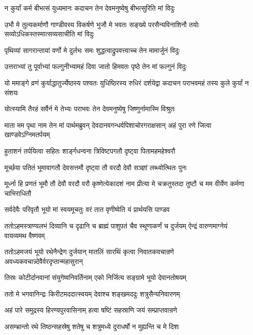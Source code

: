 \twolineshloka
{न कुर्यां कर्म बीभत्सं युध्यमानः कदाचन}
{तेन देवमनुष्येषु बीभत्सुरिति मां विदुः}


\threelineshloka
{उभौ मे तुल्यकर्माणौ गाण्डीवस्य विकर्षणे}
{भुजौ मे भवतः सङ्ख्ये परसैन्यविनाशिनौ}
{तयोः सव्योऽधिकस्तस्मात्सव्यसाचीति मां विदुः}


\twolineshloka
{पृथिव्यां सागरान्तायां वर्णो मे दुर्लभः समः}
{शुद्धत्वाद्रुपवत्त्वाच्च तेन मामार्जुनं विदुः}


\twolineshloka
{उत्तराभ्यां तु पूर्वाभ्यां फल्गुनीभ्यामहं दिवा}
{जातो हिमवतः पृष्ठे तेन मां फल्गुनं विदुः}


\threelineshloka
{यो ममाङ्गे व्रणं कुर्याद्धातुर्ज्येष्ठस्य पश्यतः}
{युधिष्ठिरस्य रुधिरं दर्शयेद्वा कदाचन}
{पराभवमहं तस्य कुले कुर्यां न संशयः}


\twolineshloka
{योत्स्यामि तैरहं सर्वैर्न मे तेभ्यः पराभवः}
{तेन देवमनुष्येषु जिष्णुर्नामास्मि विश्रुतः}


\onelineshloka
{माता मम पृथा नाम तेन मां पार्थमब्रुवन्}
\twolineshloka
{देवदानवगन्धर्वपिशाचोरगराक्षसान्}
{अहं पुरा रणे जित्वा खाण्डवेऽग्निमतर्पयम्}


\twolineshloka
{हुताशनं तर्पयित्वा सहितः शार्ङ्गधन्वना}
{त्रिविष्टपगतौ दृष्ट्वा पितामहमहेश्वरौ}


\twolineshloka
{मूर्च्छया पतितं भूमावागतौ देवसत्तमौ}
{दृष्ट्वा तौ वरदौ देवौ सञ्ज्ञां लब्ध्वोत्थितः पुनः}


\threelineshloka
{मूर्ध्ना हि प्रणतं भूमौ तौ देवौ वरदौ वरौ}
{कृष्णेत्येकादशं नाम प्रीत्या मे चक्रतुस्तदा}
{तुष्टौ च मम वीर्येण कर्मणा चाभिराधितौ}


\twolineshloka
{सर्वदेवैः परिवृतौ भूयो मां स्वयमूचतुः}
{वरं तात वृणीष्वेति यं प्रार्थयसि पाण्डव}


\threelineshloka
{ततोऽहमस्त्राण्यलभं दिव्यानि च दृढानि च}
{ब्राह्मं पाशुपतं चैव स्थूणाकर्णं च दुर्जयम्}
{ऐन्द्रं वारुणमाग्नेयं वायव्यमथ वैष्णवम्}


\threelineshloka
{ततोऽहमजयं भूयो रथेनैन्द्रेण दुर्जयान्}
{मातलिं सारथिं कृत्वा निवातकवचान्रणे}
{अवध्यकवचान्न्देवैर्वरदृप्तान्महासुरान्}


\twolineshloka
{तिस्रः कोटीर्दानवानां संयुगेष्वनिवर्तिनाम्}
{एको निर्जित्य सङ्ग्रामे भूयो देवानतोषयम्}


\twolineshloka
{ततो मे भगवानिन्द्रः किरीटमददात्स्वयम्}
{देवाश्च शङ्खमददुः शत्रुसैन्यनिवारणम्}


\twolineshloka
{अहं पारे समुद्रस्य हिरण्यपुरवासिनाम्}
{हत्वा षष्टिं सहस्राणि जयं सम्प्राप्तवान्रणे}


\twolineshloka
{असम्भ्रान्तो रथे तिष्ठन्सहस्रेषु शतेषु च}
{शत्रुमध्ये दुराधर्षो न मुह्यन्ति च मे दिशः}


